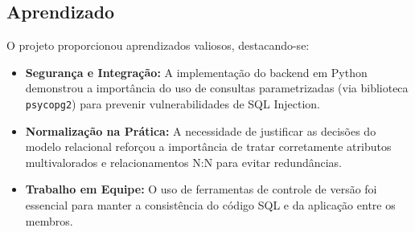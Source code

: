 \documentclass[12pt, a4paper]{article}
\begin{document}
\subsection{Aprendizado}
O projeto proporcionou aprendizados valiosos, destacando-se:
\begin{itemize}
    \item \textbf{Segurança e Integração:} A implementação do backend em Python demonstrou a importância do uso de consultas parametrizadas (via biblioteca \texttt{psycopg2}) para prevenir vulnerabilidades de SQL Injection.
    \item \textbf{Normalização na Prática:} A necessidade de justificar as decisões do modelo relacional reforçou a importância de tratar corretamente atributos multivalorados e relacionamentos N:N para evitar redundâncias.
    \item \textbf{Trabalho em Equipe:} O uso de ferramentas de controle de versão foi essencial para manter a consistência do código SQL e da aplicação entre os membros.
\end{itemize}
\end{document}

